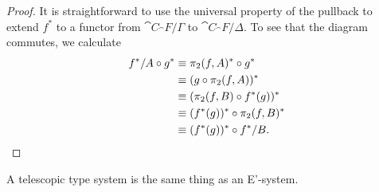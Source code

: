 \begin{proof}
It is straightforward to use the universal property of the pullback to extend
$f^\ast$ to a functor from $\cat{C}_\cat{F}/\Gamma$ to $\cat{C}_\cat{F}/\Delta$.
To see that the diagram commutes, we calculate
\begin{align*}
f^\ast/A\circ g^\ast
& \equiv
\pi_2(f,A)^\ast\circ g^\ast \\
& \equiv
(g\circ\pi_2(f,A))^\ast \\
& \equiv
(\pi_2(f,B)\circ f^\ast(g))^\ast \\
& \equiv
(f^\ast(g))^\ast\circ\pi_2(f,B)^\ast \\
& \equiv
(f^\ast(g))^\ast\circ f^\ast/B.\qedhere
\end{align*}
\end{proof}

\begin{thm}
A telescopic type system is the same thing as an E'-system.
\end{thm}

